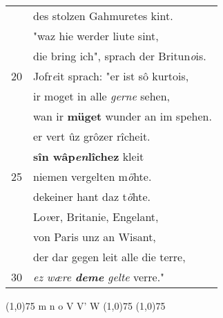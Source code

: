 \documentclass[8pt,a4paper,notitlepage]{article}
\begin{document}
\begin{table}[ht]
\begin{minipage}[t]{0.5\linewidth}
\begin{tabular}{rl}
 & des stolzen Gahmuretes kint.\\ 
 & "waz hie werder liute sint,\\ 
 & die bring ich", sprach der Britun\textit{o}is.\\ 
20 & Jofr\textit{e}it sprach: "er ist sô kurtois,\\ 
 & ir moget in alle \textit{gerne} sehen,\\ 
 & wan ir \textbf{müget} wunder an im spehen.\\ 
 & er vert ûz grôzer rîcheit.\\ 
 & \textbf{sîn wâp\textit{en}lîchez} kleit\\ 
25 & niemen vergelten m\textit{ö}hte.\\ 
 & dekeiner hant daz t\textit{ö}hte.\\ 
 & Lo\textit{v}er, Britanie, Engelant,\\ 
 & von Paris unz an Wisant,\\ 
 & der dar gegen leit alle die terre,\\ 
30 & \textit{ez wære \textbf{deme} gelte} verre."\\ 
\end{tabular}
\scriptsize
\line(1,0){75} \newline
m n o V V' W \newline
\line(1,0){75} \newline
\newline
\line(1,0){75} \newline

\end{minipage}
\end{table}
\end{document}

